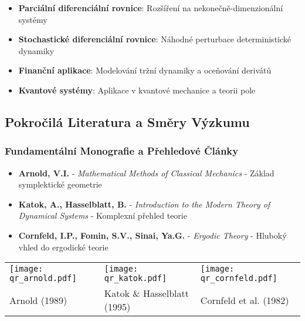 \begin{roadmap}
\begin{itemize}
\item \textbf{Parciální diferenciální rovnice}: Rozšíření na nekonečně-dimenzionální systémy
\item \textbf{Stochastické diferenciální rovnice}: Náhodné perturbace deterministické dynamiky
\item \textbf{Finanční aplikace}: Modelování tržní dynamiky a oceňování derivátů
\item \textbf{Kvantové systémy}: Aplikace v kvantové mechanice a teorii pole
\end{itemize}
\end{roadmap}

\spc

\subsection{Pokročilá Literatura a Směry Výzkumu}

\subsubsection{Fundamentální Monografie a Přehledové Články}

\begin{tcolorbox}[title=Doporučená literatura: Pokročilá teorie, floatplacement=H]
\begin{itemize}
\item \textbf{Arnold, V.I.} - \emph{Mathematical Methods of Classical Mechanics} - Základ symplektické geometrie
\item \textbf{Katok, A., Hasselblatt, B.} - \emph{Introduction to the Modern Theory of Dynamical Systems} - Komplexní přehled teorie
\item \textbf{Cornfeld, I.P., Fomin, S.V., Sinai, Ya.G.} - \emph{Ergodic Theory} - Hluboký vhled do ergodické teorie
\end{itemize}
\begin{center}
\begin{tabular}{m{}m{}m{}}
\texttt{[image: qr\_arnold.pdf]} & 
\texttt{[image: qr\_katok.pdf]} &
\texttt{[image: qr\_cornfeld.pdf]} \\
Arnold (1989) & Katok \& Hasselblatt (1995) & Cornfeld et al. (1982) \\
\end{tabular}
\end{center}
\end{tcolorbox}


